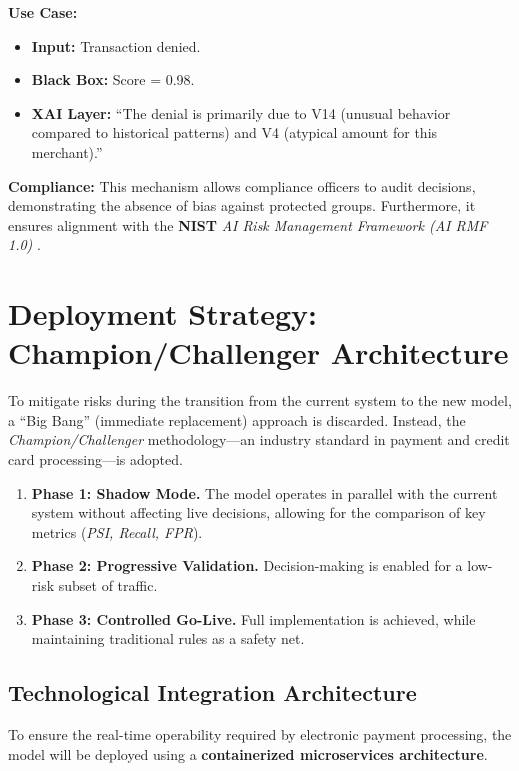 \documentclass[12pt,a4paper]{report}
\begin{document}
\textbf{Use Case:}

\begin{itemize}
    \item \textbf{Input:} Transaction denied.
    \item \textbf{Black Box:} Score = 0.98.
    \item \textbf{XAI Layer:} \textquotedblleft The denial is primarily due to V14 (unusual behavior compared to historical patterns) and V4 (atypical amount for this merchant).\textquotedblright
\end{itemize}

\textbf{Compliance:}  
This mechanism allows compliance officers to audit decisions, demonstrating the absence of bias against protected groups. Furthermore, it ensures alignment with the \textbf{NIST} \textit{AI Risk Management Framework (AI RMF 1.0)} \cite{nist2023b}.

\section{Deployment Strategy: Champion/Challenger Architecture}

To mitigate risks during the transition from the current system to the new model, a \textquotedblleft Big Bang\textquotedblright{} (immediate replacement) approach is discarded. Instead, the \textit{Champion/Challenger} methodology—an industry standard in payment and credit card processing—is adopted.

\begin{enumerate}
    \item \textbf{Phase 1: Shadow Mode.} The model operates in parallel with the current system without affecting live decisions, allowing for the comparison of key metrics (\textit{PSI, Recall, FPR}).
    \item \textbf{Phase 2: Progressive Validation.} Decision-making is enabled for a low-risk subset of traffic.
    \item \textbf{Phase 3: Controlled Go-Live.} Full implementation is achieved, while maintaining traditional rules as a safety net.
\end{enumerate}

\subsection{Technological Integration Architecture}

To ensure the real-time operability required by electronic payment processing, the model will be deployed using a \textbf{containerized microservices architecture}.
\end{document}
